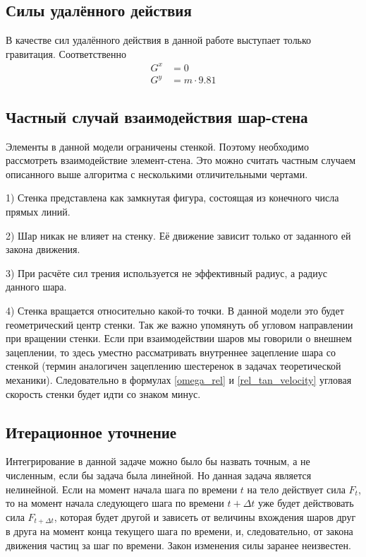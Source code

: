 \documentclass[utf8x, 14pt, oneside, a4paper]{article}
\begin{document}
\subsection{Силы удалённого действия}
\label{gravitation_subsection}

В качестве сил удалённого действия в данной работе выступает только гравитация.
Соответственно
\begin{align}
G^x &= 0 \\
G^y &= m \cdot 9.81
\end{align}

\subsection{Частный случай взаимодействия шар-стена}
\label{wall_subsection}

Элементы в данной модели ограничены стенкой. 
Поэтому необходимо рассмотреть взаимодействие элемент-стена.
Это можно считать частным случаем описанного выше алгоритма с несколькими отличительными чертами.

1) Стенка представлена как замкнутая фигура, состоящая из конечного числа прямых линий.

2) Шар никак не влияет на стенку. 
Её движение зависит только от заданного ей закона движения.

3) При расчёте сил трения используется не эффективный радиус, а радиус данного шара.

4) Стенка вращается относительно какой-то точки.
В данной модели это будет геометрический центр стенки.
Так же важно упомянуть об угловом направлении при вращении стенки.
Если при взаимодействии шаров мы говорили о внешнем зацеплении, то здесь уместно рассматривать внутреннее зацепление шара со стенкой (термин аналогичен зацеплению шестеренок в задачах теоретической механики).
Следовательно в формулах \ref{omega_rel} и \ref{rel_tan_velocity} угловая скорость стенки будет идти со знаком минус.


 
\subsection{Итерационное уточнение}
\label{iter_subsection}


Интегрирование в данной задаче можно было бы назвать точным, а не численным, если бы задача была линейной.
Но данная задача является нелинейной. 
Если на момент начала шага по времени $t$ на тело действует сила $F_t$, то на момент начала следующего шага по времени $t + \Delta t$ уже будет действовать сила $F_{t + \Delta t}$, которая будет другой и зависеть от величины вхождения шаров друг в друга на момент конца текущего шага по времени, и, следовательно, от закона движения частиц за шаг по времени. 
Закон изменения силы заранее неизвестен.
\end{document}
